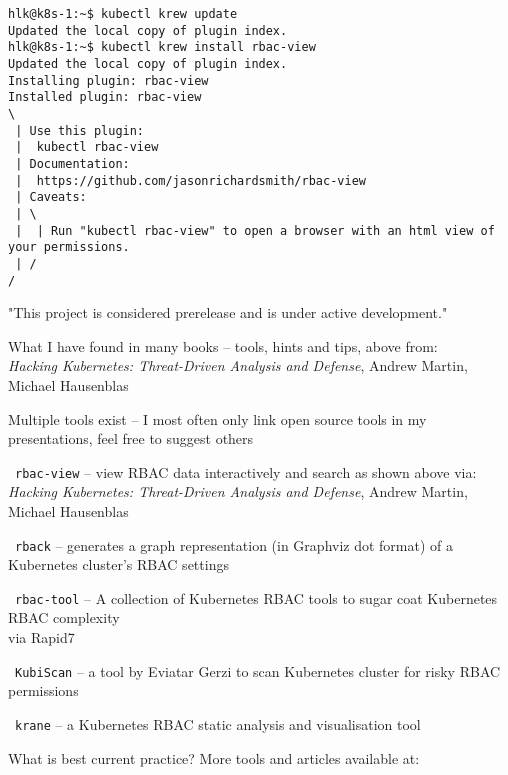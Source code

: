 \documentclass[Screen16to9,17pt]{foils}
\begin{document}


\begin{verbatim}
hlk@k8s-1:~$ kubectl krew update
Updated the local copy of plugin index.
hlk@k8s-1:~$ kubectl krew install rbac-view
Updated the local copy of plugin index.
Installing plugin: rbac-view
Installed plugin: rbac-view
\
 | Use this plugin:
 | 	kubectl rbac-view
 | Documentation:
 | 	https://github.com/jasonrichardsmith/rbac-view
 | Caveats:
 | \
 |  | Run "kubectl rbac-view" to open a browser with an html view of your permissions.
 | /
/
\end{verbatim}

\begin{list2}
\item "This project is considered prerelease and is under active development."
\item What I have found in many books -- tools, hints and tips, above from:\\
\emph{Hacking Kubernetes: Threat-Driven Analysis and Defense}, Andrew Martin, Michael Hausenblas
\end{list2}








Multiple tools exist -- I most often only link open source tools in my presentations, feel free to suggest others
\begin{list2}
\item \faWrench\ \verb+rbac-view+ -- view RBAC data interactively and search as shown above
 via:\\
\emph{Hacking Kubernetes: Threat-Driven Analysis and Defense}, Andrew Martin, Michael Hausenblas

\item \faWrench\ \verb+rback+ -- generates a graph representation (in Graphviz dot format) of a Kubernetes cluster’s RBAC settings 

\item \faWrench\ \verb+rbac-tool+ -- A collection of Kubernetes RBAC tools to sugar coat Kubernetes RBAC complexity\\
 via Rapid7

\item \faWrench\ \verb+KubiScan+ -- a tool by Eviatar Gerzi to scan Kubernetes cluster for risky RBAC permissions 
\item \faWrench\ \verb+krane+ -- a Kubernetes RBAC static analysis and visualisation tool 

\item What is best current practice? More tools and articles available at:

\end{list2}
\end{document}
